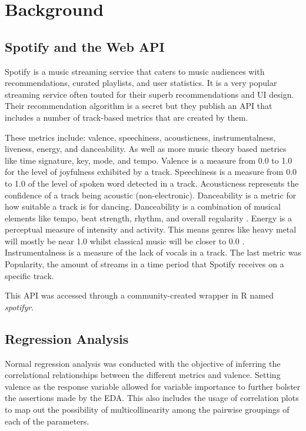 \documentclass[conference]{IEEEtran}
\begin{document}
\section{Background}

\subsection{Spotify and the  Web API}

Spotify is a music streaming service that caters to music audiences with recommendations, curated playlists, and user statistics. It is a very popular streaming service often touted for their superb recommendations and UI design. Their recommendation algorithm is a secret but they publish an API that includes a number of track-based metrics that are created by them. 

These metrics include: valence, speechiness, acousticness, instrumentalness, liveness, energy, and danceability. As well as more music theory based metrics like time signature, key,  mode, and tempo. Valence is a measure from 0.0 to 1.0 for the level of joyfulness exhibited by a track. Speechiness is a measure from 0.0 to 1.0 of the level of spoken word detected in a track. Acousticness represents the confidence of a track being acoustic (non-electronic). Danceability is a metric for how suitable a track is for dancing. Danceability is a combination of musical elements like tempo, beat strength, rhythm, and overall regularity \cite{b4}. Energy is a perceptual measure of intensity and activity. This means genres like heavy metal will mostly be near 1.0 whilst classical music will be closer to 0.0 \cite{b4}. Instrumentalness is a measure of the lack of vocals in a track. The last metric was Popularity, the amount of streams in a time period that Spotify receives on a specific track.

This API was accessed through a community-created wrapper in R named \textit{spotifyr}.

\subsection{Regression Analysis}

Normal regression analysis was conducted with the objective of inferring the correlational relationships between the different metrics and valence. Setting valence as the response variable allowed for variable importance to further bolster the assertions made by the EDA. This also includes the usage of correlation plots to map out the possibility of multicollinearity among the pairwise groupings of each of the parameters. 
\end{document}
